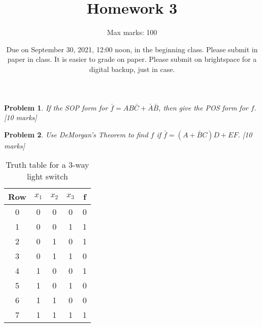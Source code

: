 \documentclass[twocolumn]{article}
\title{Homework 3}
\author{Max marks: 100}
\date{Due on September 30, 2021, 12:00 noon, in the beginning class. Please submit in paper
 in class. It is easier to grade on paper. Please submit on brightspace for a
digital backup, just in case.}
\newtheorem{prob}{Problem}
\newcommand{\bA}{\bar{A}}
\newcommand{\bB}{\bar{B}}
\newcommand{\bC}{\bar{C}}
\begin{document}
\maketitle

\begin{prob}
If the SOP form for $ \bar{f} = AB\bC+\bA\bB$, then give the POS form for
$f$. [10 marks]
\end{prob}

\begin{prob}
Use DeMorgan's Theorem to find $f$  if  $\bar{f} = (A + \bB C)D + EF$. [10 marks]
\end{prob}



\begin{table}
  \centering
  \begin{tabular}{c|ccc||c}
    \toprule
    Row & $x_1$ & $x_2$ & $x_3$ & f \\
    \midrule
    0 & 0 & 0 & 0 & 0 \\
    1 & 0 & 0 & 1 & 1 \\
    2 & 0 & 1 & 0 & 1 \\
    3 & 0 & 1 & 1 & 0 \\
    4 & 1 & 0 & 0 & 1 \\
    5 & 1 & 0 & 1 & 0 \\
    6 & 1 & 1 & 0 & 0 \\
    7 & 1 & 1 & 1 & 1 \\
    \bottomrule
    \end{tabular}
    \caption{Truth table for a 3-way light switch}
    \label{tab:3-way-light-switch}
\end{table}
\end{document}
